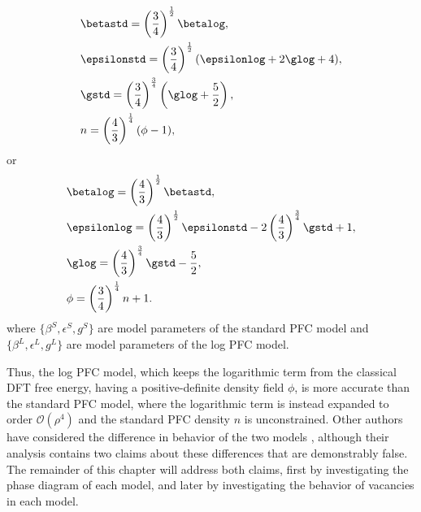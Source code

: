 \begin{subequations}\label{eq-log-to-std-pfc-model}
\begin{align}
& \betastd = \left( \frac{3}{4} \right)^{\frac{1}{2}} \betalog, \label{eq-log-to-std-pfc-beta} \\
& \epsilonstd = \left( \frac{3}{4} \right)^{\frac{1}{2}}(\epsilonlog + 2 \glog + 4), \label{eq-log-to-std-pfc-epsilon} \\
& \gstd = \left( \frac{3}{4} \right)^{\frac{3}{4}} \left( \glog + \frac{5}{2} \right), \label{eq-log-to-std-pfc-g} \\
& n = \left( \frac{4}{3} \right)^{\frac{1}{4}}(\phi - 1), \label{eq-log-to-std-pfc-phi}
\end{align}
\end{subequations}
%
or
%
\begin{subequations}\label{eq-std-to-log-pfc-model}
\begin{align}
& \betalog = \left( \frac{4}{3} \right)^{\frac{1}{2}} \betastd, \label{eq-std-to-log-pfc-beta}  \\
& \epsilonlog = \left( \frac{4}{3} \right)^{\frac{1}{2}} \epsilonstd - 2 \left( \frac{4}{3} \right)^{\frac{3}{4}} \gstd + 1, \label{eq-std-to-log-pfc-epsilon} \\
& \glog = \left( \frac{4}{3} \right)^{\frac{3}{4}} \gstd - \frac{5}{2}, \label{eq-std-to-log-pfc-g} \\
& \phi = \left( \frac{3}{4} \right)^{\frac{1}{4}} n + 1. \label{eq-std-to-log-pfc-n}
\end{align}
\end{subequations}
%
where $\{\beta^S, \epsilon^S, g^S\}$ are model parameters of the standard PFC model and $\{\beta^L, \epsilon^L, g^L\}$ are model parameters of the log PFC model.

Thus, the log PFC model, which keeps the logarithmic term from the classical DFT free energy, having a positive-definite density field $\phi$, is more accurate than the standard PFC model, where the logarithmic term is instead expanded to order $\mathcal{O}(\rho^4)$ and the standard PFC density $n$ is unconstrained.  Other authors have considered the difference in behavior of the two models \cite{archer2019Deriving, chan2009vacancy}, although their analysis contains two claims about these differences that are demonstrably false. The remainder of this chapter will address both claims, first by investigating the phase diagram of each model, and later by investigating the behavior of vacancies in each model.
%
